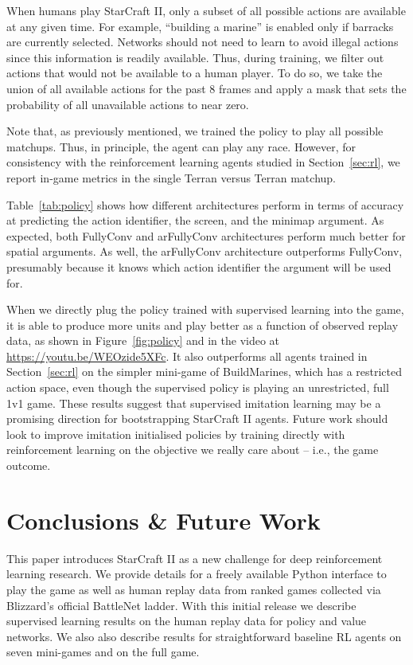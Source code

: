 When humans play StarCraft II, only a subset of all possible actions are available at any given time. For example, ``building a marine'' is enabled only if barracks are currently selected. Networks should not need to learn to avoid illegal actions since this information is readily available.  Thus, during training, we filter out actions that would not be available to a human player. To do so, we take the union of all available actions for the past $8$ frames and apply a mask that sets the probability of all unavailable actions to near zero.

Note that, as previously mentioned, we trained the policy to play all possible matchups. Thus, in principle, the agent can play any race. However, for consistency with the reinforcement learning agents studied in Section~\ref{sec:rl}, we report in-game metrics in the single Terran versus Terran matchup.

Table~\ref{tab:policy} shows how different architectures perform in terms of accuracy at predicting the action identifier, the screen, and the minimap argument. As expected, both FullyConv and arFullyConv architectures perform much better for spatial arguments.  As well, the arFullyConv architecture outperforms FullyConv, presumably because it knows which action identifier the argument will be used for.

When we directly plug the policy trained with supervised learning into the game, it is able to produce more units and play better as a function of observed replay data, as shown in Figure~\ref{fig:policy} and in the video at \url{https://youtu.be/WEOzide5XFc}. It also outperforms all agents trained in Section~\ref{sec:rl} on the simpler  mini-game of BuildMarines, which has a restricted action space, even though the supervised policy is playing an unrestricted, full 1v1 game. These results suggest that supervised imitation learning may be a promising direction for bootstrapping StarCraft II agents. Future work should look to improve imitation initialised policies by training directly with reinforcement learning on the objective we really care about -- i.e., the game outcome.

\section{Conclusions \& Future Work}

This paper introduces StarCraft II as a new challenge for deep reinforcement learning research.  We provide details for a freely available Python interface to play the game as well as human replay data from ranked games collected via Blizzard's official BattleNet ladder.  With this initial release we describe supervised learning results on the human replay data for policy and value networks.  We also also describe results for straightforward baseline RL agents on seven mini-games and on the full game.  

